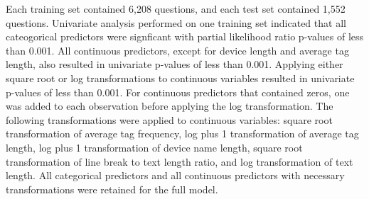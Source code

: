 \documentclass{article}
\begin{document}


Each training set contained 6,208 questions, and each test set contained 1,552 questions. Univariate analysis performed on one training set indicated that all cateogorical predictors were signficant with partial likelihood ratio p-values of less than 0.001. All continuous predictors, except for device length and average tag length, also resulted in univariate p-values of less than 0.001. Applying either square root or log transformations to continuous variables resulted in univariate p-values of less than 0.001. For continuous predictors that contained zeros, one was added to each observation before applying the log transformation. The following transformations were applied to continuous variables: square root transformation of average tag frequency, log plus 1 transformation of average tag length, log plus 1 transformation of device name length, square root transformation of line break to text length ratio, and log transformation of text length. All categorical predictors and all continuous predictors with necessary transformations were retained for the full model. 
\end{document}
